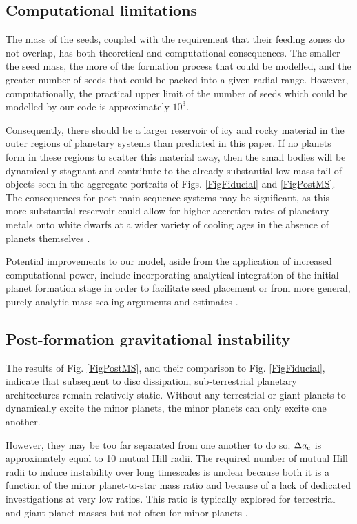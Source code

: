 \documentclass[useAMS,usenatbib]{mn2e}
\newcommand{\rev}{ }
\begin{document}
{\rev
\subsection{Computational limitations}

The mass of the seeds, coupled with the requirement that their feeding zones do not overlap, has both theoretical and computational consequences. The smaller the seed mass, the more of the formation process that could be modelled, and the greater number of seeds that could be packed into a given radial range. However, computationally, the practical upper limit of the number of seeds which could be modelled by our code is approximately $10^3$.

Consequently, there should be a larger reservoir of icy and rocky material in the outer regions of planetary systems than predicted in this paper. If no planets form in these regions to scatter this material away, then the small bodies will be dynamically stagnant and contribute to the already substantial low-mass tail of objects seen in the aggregate portraits of Figs. \ref{FigFiducial} and \ref{FigPostMS}. The consequences for post-main-sequence systems may be significant, as this more substantial reservoir could allow for higher accretion rates of planetary metals onto white dwarfs at a wider variety of cooling ages in the absence of planets themselves \citep{veretal2022}.

Potential improvements to our model, aside from the application of increased computational power, include incorporating analytical integration of the initial planet formation stage in order to facilitate seed placement \citep{voeetal2020,voeetal2021a,voeetal2021b} or from more general, purely analytic mass scaling arguments and estimates \citep[e.g.][]{goletal2004,emsetal2023}.

}


\subsection{Post-formation gravitational instability}

The results of Fig. \ref{FigPostMS}, and their comparison to Fig. \ref{FigFiducial}, indicate that subsequent to disc dissipation, sub-terrestrial planetary architectures remain relatively static. Without any terrestrial or giant planets to dynamically excite the minor planets, the minor planets can only excite one another.

However, they may be too far separated from one another to do so. $\Delta a_{\rm c}$ is approximately equal to 10 mutual Hill radii. The required number of mutual Hill radii to induce instability over long timescales is unclear because both it is a function of the minor planet-to-star mass ratio and because of a lack of dedicated investigations at very low ratios. This ratio is typically explored for terrestrial and giant planet masses but not often for minor planets \citep{chaetal1996,zhoetal2007,chaetal2008,smilis2009,funetal2010,puwu2015,yeeetal2021,ricste2023,yanetal2023}.
\end{document}
